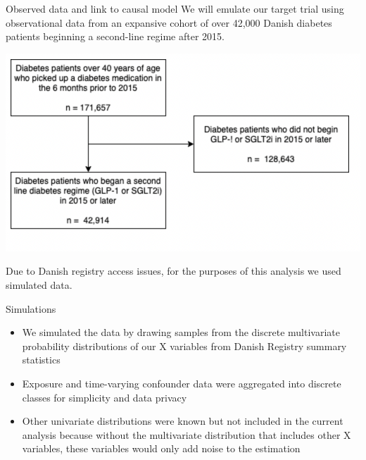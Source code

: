 \documentclass[
  ignorenonframetext,
  twocolumn]{beamer}
\providecommand{\tightlist}{%
  \setlength{\itemsep}{0pt}\setlength{\parskip}{0pt}}
\renewcommand{\tightlist}{\setlength{\itemsep}{2ex}\setlength{\parskip}{0pt}}
\begin{document}
\begin{frame}{Observed data and link to causal model}
\protect\hypertarget{observed-data-and-link-to-causal-model}{}
We will emulate our target trial using observational data from an
expansive cohort of over 42,000 Danish diabetes patients beginning a
second-line regime after 2015.

\begin{center}\includegraphics[width=0.75\linewidth]{consort} \end{center}

Due to Danish registry access issues, for the purposes of this analysis
we used simulated data.
\end{frame}

\begin{frame}{Simulations}
\protect\hypertarget{simulations}{}
\begin{itemize}
\tightlist
\item
  We simulated the data by drawing samples from the discrete
  multivariate probability distributions of our X variables from Danish
  Registry summary statistics
\item
  Exposure and time-varying confounder data were aggregated into
  discrete classes for simplicity and data privacy
\item
  Other univariate distributions were known but not included in the
  current analysis because without the multivariate distribution that
  includes other X variables, these variables would only add noise to
  the estimation
\end{itemize}
\end{frame}
\end{document}

